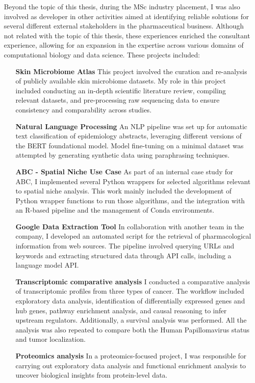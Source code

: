 Beyond the topic of this thesis, during the MSc industry placement, I was also involved as developer in other activities aimed at identifying reliable solutions for several different external stakeholders in the pharmaceutical business. 
Although not related with the topic of this thesis, these experiences enriched the consultant experience, allowing for an expansion in the expertise across various domains of computational biology and data science. 
These projects included:

\begin{enumerate}
\item[\textbf{Skin Microbiome Atlas}] This project involved the curation and re-analysis of publicly available skin microbiome datasets. My role in this project included conducting an in-depth scientific literature review, compiling relevant datasets, and pre-processing raw sequencing data to ensure consistency and comparability across studies. 
\item[\textbf{Natural Language Processing}] An NLP pipeline was set up for automatic text classification of epidemiology abstracts, leveraging different versions of the BERT foundational model. Model fine-tuning on a minimal dataset was attempted by generating synthetic data using paraphrasing techniques. 
\item[\textbf{\gls{ABC} - Spatial Niche Use Case}] As part of an internal case study for \gls{ABC}, I implemented several Python wrappers for selected algorithms relevant to spatial niche analysis. This work mainly included the development of Python wrapper functions to run those algorithms, and the integration with an \gls{R}-based pipeline and the management of Conda environments.
\item[\textbf{Google Data Extraction Tool}] In collaboration with another team in the company, I developed an automated script for the retrieval of pharmacological information from web sources. The pipeline involved querying URLs and keywords and extracting structured data through API calls, including a language model API.
\item[\textbf{Transcriptomic comparative analysis}] I conducted a comparative analysis of transcriptomic profiles from three types of cancer. The workflow included exploratory data analysis, identification of differentially expressed genes and hub genes, pathway enrichment analysis, and causal reasoning to infer upstream regulators. Additionally, a survival analysis was performed. All the analysis was also repeated to compare both the Human Papillomavirus status and tumor localization.
\item[\textbf{Proteomics analysis}] In a proteomics-focused project, I was responsible for carrying out exploratory data analysis and functional enrichment analysis to uncover biological insights from protein-level data.
\end{enumerate}

